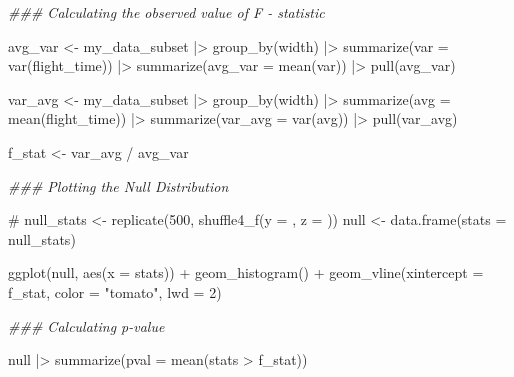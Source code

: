 \documentclass[
  letterpaper,
  DIV=11,
  numbers=noendperiod]{scrartcl}
\newenvironment{Shaded}{\begin{snugshade}}{\end{snugshade}}
\newcommand{\AttributeTok}[1]{\textcolor[rgb]{0.40,0.45,0.13}{#1}}
\newcommand{\CommentTok}[1]{\textcolor[rgb]{0.37,0.37,0.37}{#1}}
\newcommand{\DecValTok}[1]{\textcolor[rgb]{0.68,0.00,0.00}{#1}}
\newcommand{\DocumentationTok}[1]{\textcolor[rgb]{0.37,0.37,0.37}{\textit{#1}}}
\newcommand{\FunctionTok}[1]{\textcolor[rgb]{0.28,0.35,0.67}{#1}}
\newcommand{\NormalTok}[1]{\textcolor[rgb]{0.00,0.23,0.31}{#1}}
\newcommand{\OtherTok}[1]{\textcolor[rgb]{0.00,0.23,0.31}{#1}}
\newcommand{\SpecialCharTok}[1]{\textcolor[rgb]{0.37,0.37,0.37}{#1}}
\newcommand{\StringTok}[1]{\textcolor[rgb]{0.13,0.47,0.30}{#1}}
\begin{document}
\begin{Shaded}
\begin{Highlighting}[]
\DocumentationTok{\#\#\# Calculating the observed value of F {-} statistic}

\NormalTok{avg\_var }\OtherTok{\textless{}{-}}\NormalTok{ my\_data\_subset }\SpecialCharTok{|\textgreater{}}
  \FunctionTok{group\_by}\NormalTok{(width) }\SpecialCharTok{|\textgreater{}}
  \FunctionTok{summarize}\NormalTok{(}\AttributeTok{var =} \FunctionTok{var}\NormalTok{(flight\_time)) }\SpecialCharTok{|\textgreater{}}
  \FunctionTok{summarize}\NormalTok{(}\AttributeTok{avg\_var =} \FunctionTok{mean}\NormalTok{(var)) }\SpecialCharTok{|\textgreater{}}
  \FunctionTok{pull}\NormalTok{(avg\_var)}

\NormalTok{var\_avg }\OtherTok{\textless{}{-}}\NormalTok{ my\_data\_subset }\SpecialCharTok{|\textgreater{}}
  \FunctionTok{group\_by}\NormalTok{(width) }\SpecialCharTok{|\textgreater{}}
  \FunctionTok{summarize}\NormalTok{(}\AttributeTok{avg =} \FunctionTok{mean}\NormalTok{(flight\_time)) }\SpecialCharTok{|\textgreater{}}
  \FunctionTok{summarize}\NormalTok{(}\AttributeTok{var\_avg =} \FunctionTok{var}\NormalTok{(avg)) }\SpecialCharTok{|\textgreater{}}
  \FunctionTok{pull}\NormalTok{(var\_avg)}

\NormalTok{f\_stat }\OtherTok{\textless{}{-}}\NormalTok{ var\_avg }\SpecialCharTok{/}\NormalTok{ avg\_var}
\end{Highlighting}
\end{Shaded}

\begin{Shaded}
\begin{Highlighting}[]
\DocumentationTok{\#\#\# Plotting the Null Distribution}

\CommentTok{\# null\_stats \textless{}{-} replicate(500, shuffle4\_f(y = , z = ))}
\NormalTok{null }\OtherTok{\textless{}{-}} \FunctionTok{data.frame}\NormalTok{(}\AttributeTok{stats =}\NormalTok{ null\_stats)}

\FunctionTok{ggplot}\NormalTok{(null, }\FunctionTok{aes}\NormalTok{(}\AttributeTok{x =}\NormalTok{ stats)) }\SpecialCharTok{+}
  \FunctionTok{geom\_histogram}\NormalTok{() }\SpecialCharTok{+}
  \FunctionTok{geom\_vline}\NormalTok{(}\AttributeTok{xintercept =}\NormalTok{ f\_stat, }\AttributeTok{color =} \StringTok{"tomato"}\NormalTok{, }\AttributeTok{lwd =} \DecValTok{2}\NormalTok{)}

\DocumentationTok{\#\#\# Calculating p{-}value}

\NormalTok{null }\SpecialCharTok{|\textgreater{}}
  \FunctionTok{summarize}\NormalTok{(}\AttributeTok{pval =} \FunctionTok{mean}\NormalTok{(stats }\SpecialCharTok{\textgreater{}}\NormalTok{ f\_stat))}
\end{Highlighting}
\end{Shaded}
\end{document}
